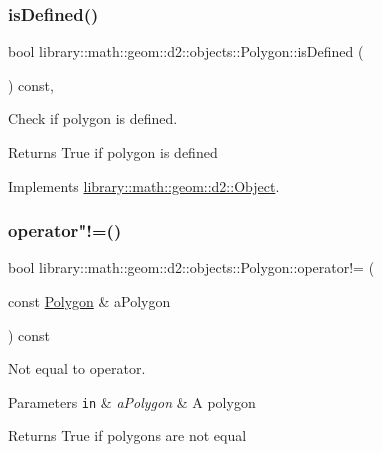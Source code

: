 \subsubsection{\texorpdfstring{is\+Defined()}{isDefined()}}
{\footnotesize\ttfamily bool library\+::math\+::geom\+::d2\+::objects\+::\+Polygon\+::is\+Defined (\begin{DoxyParamCaption}{ }\end{DoxyParamCaption}) const\hspace{0.3cm}{\ttfamily [override]}, {\ttfamily [virtual]}}



Check if polygon is defined. 

\begin{DoxyReturn}{Returns}
True if polygon is defined 
\end{DoxyReturn}


Implements \hyperlink{classlibrary_1_1math_1_1geom_1_1d2_1_1_object_ae9506254971168a3ca63e1923556b70d}{library\+::math\+::geom\+::d2\+::\+Object}.

\mbox{\label{classlibrary_1_1math_1_1geom_1_1d2_1_1objects_1_1_polygon_a904fe22c8a690a6b5eb4f8746602d637}} 
\subsubsection{\texorpdfstring{operator"!=()}{operator!=()}}
{\footnotesize\ttfamily bool library\+::math\+::geom\+::d2\+::objects\+::\+Polygon\+::operator!= (\begin{DoxyParamCaption}\item[{const \hyperlink{classlibrary_1_1math_1_1geom_1_1d2_1_1objects_1_1_polygon}{Polygon} \&}]{a\+Polygon }\end{DoxyParamCaption}) const}



Not equal to operator. 


\begin{DoxyParams}[1]{Parameters}
\mbox{\tt in}  & {\em a\+Polygon} & A polygon \\
\hline
\end{DoxyParams}
\begin{DoxyReturn}{Returns}
True if polygons are not equal 
\end{DoxyReturn}
\mbox{\label{classlibrary_1_1math_1_1geom_1_1d2_1_1objects_1_1_polygon_afd72b5c2aa958835958d197ee57c3152}} 
